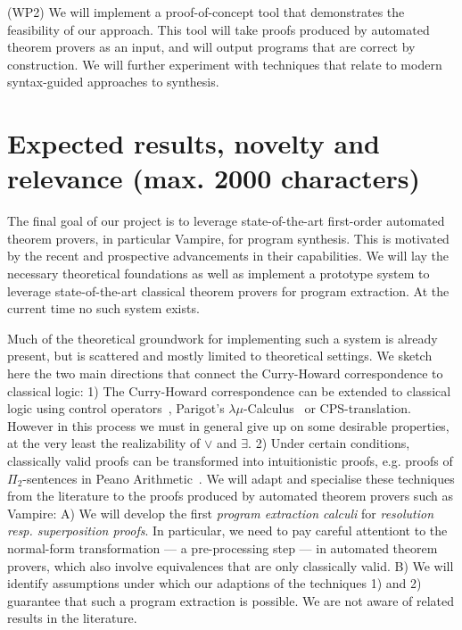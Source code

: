 \documentclass[a4paper,12pt]{article}
\begin{document}
(WP2) We will implement a proof-of-concept tool that demonstrates the feasibility of our approach.
This tool will take proofs produced by automated theorem provers as an input, and will output programs that are correct by construction.
We will further experiment with techniques that relate to modern syntax-guided approaches to synthesis.


\section{Expected results, novelty and relevance (max. 2000 characters)}

The final goal of our project is to leverage state-of-the-art first-order automated
theorem provers, in particular Vampire, for program synthesis.
This is motivated by the recent and prospective advancements in their capabilities.
We will lay the necessary theoretical foundations as well as implement a prototype system to leverage state-of-the-art classical theorem provers for program extraction.
At the current time no such system exists.

Much of the theoretical groundwork for implementing such a system is already present,
but is scattered and mostly limited to theoretical settings.
We sketch here the two main directions that connect the Curry-Howard correspondence to classical logic:
1) The Curry-Howard correspondence can be extended to classical logic using control operators~\cite{Control1}, Parigot's $\lambda\mu$-Calculus~\cite{Parigot1} or CPS-translation.
However in this process we must in general give up on some desirable properties, at the very least the realizability of $\vee$ and $\exists$.
2) Under certain conditions, classically valid proofs can be transformed into intuitionistic proofs, e.g. proofs of $\Pi_2$-sentences in Peano Arithmetic~\cite{HAPA}.
We will adapt and specialise these techniques from the literature to the proofs produced by automated theorem provers such as Vampire:
A) We will develop the first\emph{ program extraction calculi} for \emph{resolution resp. superposition proofs}.
In particular, we need to pay careful attentiont to the normal-form transformation --- a pre-processing step --- in automated theorem provers, which also involve equivalences that are only classically valid.
B) We will identify assumptions under which our adaptions of the techniques 1) and 2) guarantee that such a program extraction is possible.
We are not aware of related results in the literature.
\end{document}
